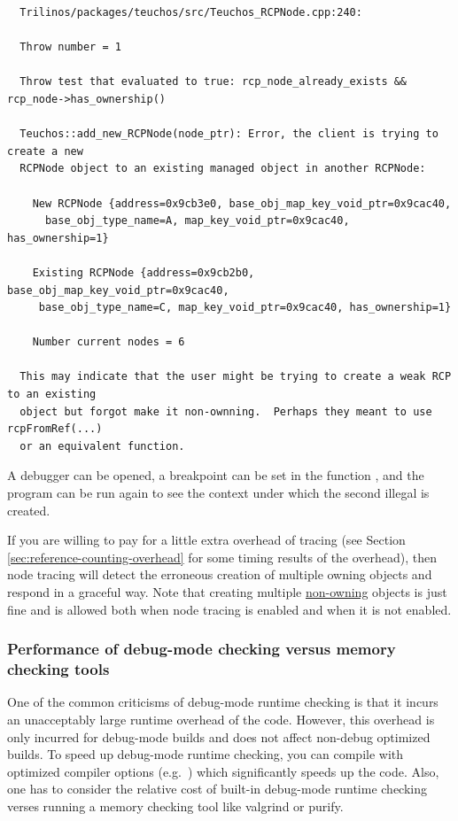 \documentclass[pdf,ps2pdf,11pt]{SANDreport}
\begin{document}
{\small\begin{verbatim}
  Trilinos/packages/teuchos/src/Teuchos_RCPNode.cpp:240:
  
  Throw number = 1
  
  Throw test that evaluated to true: rcp_node_already_exists && rcp_node->has_ownership()
  
  Teuchos::add_new_RCPNode(node_ptr): Error, the client is trying to create a new
  RCPNode object to an existing managed object in another RCPNode:
  
    New RCPNode {address=0x9cb3e0, base_obj_map_key_void_ptr=0x9cac40,
      base_obj_type_name=A, map_key_void_ptr=0x9cac40, has_ownership=1}
  
    Existing RCPNode {address=0x9cb2b0, base_obj_map_key_void_ptr=0x9cac40,
     base_obj_type_name=C, map_key_void_ptr=0x9cac40, has_ownership=1}
  
    Number current nodes = 6
  
  This may indicate that the user might be trying to create a weak RCP to an existing
  object but forgot make it non-ownning.  Perhaps they meant to use rcpFromRef(...)
  or an equivalent function.
\end{verbatim}}

A debugger can be opened, a breakpoint can be set in the function
{}, and the program can be run
again to see the context under which the second illegal
{} is created.

If you are willing to pay for a little extra overhead of
{} tracing (see Section
{}\ref{sec:reference-counting-overhead} for some timing results of the
overhead), then node tracing will detect the erroneous creation of
multiple owning {} objects and respond in a graceful
way.  Note that creating multiple {}\underline{non-owning}
{} objects is just fine and is allowed both when node
tracing is enabled and when it is not enabled.


%
{}\subsubsection{Performance of debug-mode checking versus memory
checking tools}
%

One of the common criticisms of debug-mode runtime checking is that it
incurs an unacceptably large runtime overhead of the code.  However,
this overhead is only incurred for debug-mode builds and does not
affect non-debug optimized builds.  To speed up debug-mode runtime
checking, you can compile with optimized compiler options (e.g.\
{}) which significantly speeds up the code.  Also, one has
to consider the relative cost of built-in debug-mode runtime checking
verses running a memory checking tool like valgrind or purify.
\end{document}
